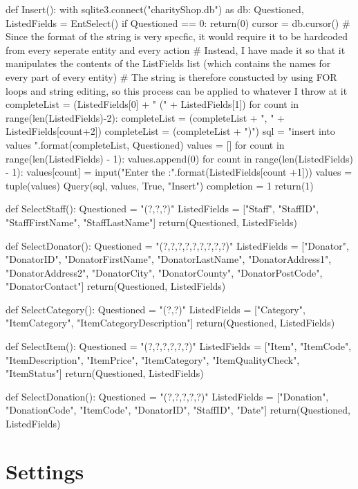 \begin{python}
def Insert():
    with sqlite3.connect("charityShop.db") as db:
        Questioned, ListedFields = EntSelect()
        if Questioned == 0:
            return(0)
        cursor = db.cursor()
# Since the format of the string is very specfic, it would require it to be hardcoded from every seperate entity and every action
# Instead, I have made it so that it manipulates the contents of the ListFields list (which contains the names for every part of every entity)
# The string is therefore constucted by using FOR loops and string editing, so this process can be applied to whatever I throw at it
        completeList = (ListedFields[0] + " (" + ListedFields[1])
        for count in range(len(ListedFields)-2):
            completeList = (completeList + ", " + ListedFields[count+2])    
        completeList = (completeList + ")")
        sql = "insert into {} values {}".format(completeList, Questioned)
        values = []
        for count in range(len(ListedFields) - 1):
            values.append(0)
        for count in range(len(ListedFields) - 1):
            values[count] = input("Enter the {} :".format(ListedFields[count +1]))
        values = tuple(values)
        Query(sql, values, True, "Insert")
        completion = 1
        return(1)

def SelectStaff():
    Questioned = "(?,?,?)"
    ListedFields = ["Staff", "StaffID", "StaffFirstName", "StaffLastName"]
    return(Questioned, ListedFields)

def SelectDonator():
    Questioned = "(?,?,?,?,?,?,?,?,?)"
    ListedFields = ["Donator", "DonatorID", "DonatorFirstName", "DonatorLastName", "DonatorAddress1", "DonatorAddress2", "DonatorCity", "DonatorCounty", "DonatorPostCode", "DonatorContact"]
    return(Questioned, ListedFields)

def SelectCategory():
    Questioned = "(?,?)"
    ListedFields = ["Category", "ItemCategory", "ItemCategoryDescription"]
    return(Questioned, ListedFields)

def SelectItem():
    Questioned = "(?,?,?,?,?,?)"
    ListedFields = ["Item", "ItemCode", "ItemDescription", "ItemPrice", "ItemCategory", "ItemQualityCheck", "ItemStatus"]
    return(Questioned, ListedFields)

def SelectDonation():
    Questioned = "(?,?,?,?,?)"
    ListedFields = ["Donation", "DonationCode", "ItemCode", "DonatorID", "StaffID", "Date"]
    return(Questioned, ListedFields)
\end{python}
\section{Settings}

